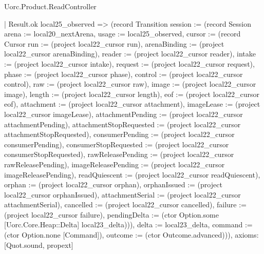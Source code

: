 \begin{lexlean}{Uorc.Product.ReadController}
\begin{semanticmodule}
{    | Result.ok local25_observed => (record Transition {session := (record Session {arena := local20_nextArena, usage := local25_observed, cursor := (record Cursor {run := (project local22_cursor run), arenaBinding := (project local22_cursor arenaBinding), reader := (project local22_cursor reader), intake := (project local22_cursor intake), request := (project local22_cursor request), phase := (project local22_cursor phase), control := (project local22_cursor control), raw := (project local22_cursor raw), image := (project local22_cursor image), length := (project local22_cursor length), eof := (project local22_cursor eof), attachment := (project local22_cursor attachment), imageLease := (project local22_cursor imageLease), attachmentPending := (project local22_cursor attachmentPending), attachmentStopRequested := (project local22_cursor attachmentStopRequested), consumerPending := (project local22_cursor consumerPending), consumerStopRequested := (project local22_cursor consumerStopRequested), rawReleasePending := (project local22_cursor rawReleasePending), imageReleasePending := (project local22_cursor imageReleasePending), readQuiescent := (project local22_cursor readQuiescent), orphan := (project local22_cursor orphan), orphanIssued := (project local22_cursor orphanIssued), attachmentSerial := (project local22_cursor attachmentSerial), cancelled := (project local22_cursor cancelled), failure := (project local22_cursor failure), pendingDelta := (ctor Option.some [Uorc.Core.Heap::Delta] local23_delta)})}), delta := local23_delta, command := (ctor Option.none [Command]), outcome := (ctor Outcome.advanced)})),
  axioms: [Quot.sound, propext]
}


\end{semanticmodule}
\end{lexlean}
